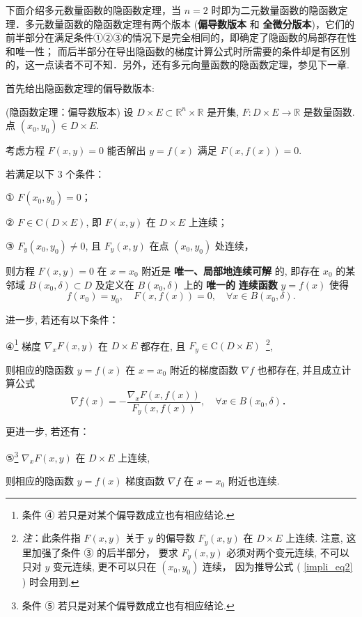 下面介绍多元数量函数的隐函数定理，当 $n=2$ 时即为二元数量函数的隐函数定理．多元数量函数的隐函数定理有两个版本 (\textbf{偏导数版本} 和\textbf{ 全微分版本})，它们的前半部分在满足条件①②③的情况下是完全相同的，即确定了隐函数的局部存在性和唯一性； 而后半部分在导出隐函数的梯度计算公式时所需要的条件却是有区别的，这一点读者不可不知．另外，还有多元向量函数的隐函数定理，参见下一章.

首先给出隐函数定理的偏导数版本:

 \begin{theorem}{(隐函数定理：偏导数版本)}\label{impli_the2}
 设 $D\times E\subset\mathbb{R}^{n}\times\mathbb{R}$ 是开集, $F:D\times E\rightarrow\mathbb{R}$
是数量函数. 点 $(x_{0},y_{0})\in D\times E.$ 

考虑方程 $F(x,y)=0$ 能否解出 $y=f(x)$ 满足 $F(x,f(x))=0.$ 

若满足以下 3 个条件：

① $F(x_{0},y_{0})=0$；

② $F\in\mathrm{C}(D\times E)$, 即 $F(x,y)$ 在 $D\times E$ 上连续； 

③ $F_{y}(x_{0},y_{0})\neq0$, 且 $F_{y}(x,y)$ 在点 $(x_0,y_0)$ 处连续，

则方程 $F(x,y)=0$ 在 $x=x_{0}$ 附近是\textbf{ 唯一、局部地连续可解} 的, 即存在 $x_{0}$
的某邻域 $B(x_{0},\delta)\subset D$ 及定义在 $B(x_{0},\delta)$ 上的 \textbf{唯一的} \textbf{
连续函数} $y=f(x)$ 使得
\[
f(x_{0})=y_{0},\quad F(x,f(x))=0,\quad\forall x\in B(x_{0},\delta).
\]

进一步, 若还有以下条件：

④\footnote{条件 ④ 若只是对某个偏导数成立也有相应结论. } 梯度 $\nabla_{x}F(x,y)$ 在 $D\times E$
都存在, 且 $F_y\in\mathrm{C}(D\times E)$ $\,$\footnote{\textsl{注}：此条件指 $F(x,y)$ 关于 $y$ 的偏导数 $F_{y}(x,y)$
 在 $D\times E$ 上连续. 注意, 这里加强了条件 ③ 的后半部分， 要求 $F_{y}(x,y)$ 必须对两个变元连续, 不可以只对 $y$
 变元连续, 更不可以只在 $(x_0,y_0)$ 连续， 因为推导公式 ( \autoref{impli_eq2} ) 时会用到.},

则相应的隐函数 $y=f(x)$ 在 $x=x_{0}$ 附近的梯度函数 $\nabla f$ 也都存在, 并且成立计算公式
\[
\nabla f(x)=-{\displaystyle \frac{\nabla_{x}F(x,f(x))}{F_{y}(x,f(x))}},\quad\forall x\in B(x_{0},\delta)．
\]

更进一步, 若还有：

⑤\footnote{条件 ⑤ 若只是对某个偏导数成立也有相应结论.} $\nabla_{x}F(x,y)$ 在 $D\times E$
上连续, 

则相应的隐函数 $y=f(x)$ 梯度函数 $\nabla f$ 在 $x=x_{0}$ 附近也连续.


\end{theorem}
